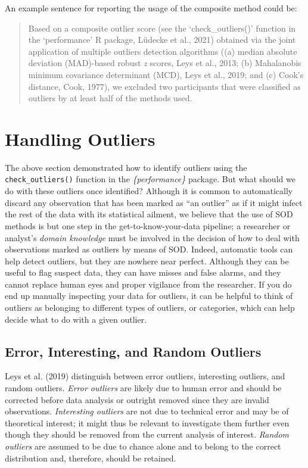 \documentclass{article}
\begin{document}
An example sentence for reporting the usage of the composite method
could be:

\begin{quote}
Based on a composite outlier score (see the `check\_outliers()' function
in the `performance' R package, Lüdecke et al., 2021) obtained via the
joint application of multiple outliers detection algorithms ((a) median
absolute deviation (MAD)-based robust \emph{z} scores, Leys et al.,
2013; (b) Mahalanobis minimum covariance determinant (MCD), Leys et al.,
2019; and (c) Cook's distance, Cook, 1977), we excluded two participants
that were classified as outliers by at least half of the methods used.
\end{quote}

\hypertarget{handling-outliers}{%
\section{Handling Outliers}\label{handling-outliers}}

The above section demonstrated how to identify outliers using the
\texttt{check\_outliers()} function in the \emph{\{performance\}}
package. But what should we do with these outliers once identified?
Although it is common to automatically discard any observation that has
been marked as ``an outlier'' as if it might infect the rest of the data
with its statistical ailment, we believe that the use of SOD methods is
but one step in the get-to-know-your-data pipeline; a researcher or
analyst's \emph{domain knowledge} must be involved in the decision of
how to deal with observations marked as outliers by means of SOD.
Indeed, automatic tools can help detect outliers, but they are nowhere
near perfect. Although they can be useful to flag suspect data, they can
have misses and false alarms, and they cannot replace human eyes and
proper vigilance from the researcher. If you do end up manually
inspecting your data for outliers, it can be helpful to think of
outliers as belonging to different types of outliers, or categories,
which can help decide what to do with a given outlier.

\hypertarget{error-interesting-and-random-outliers}{%
\subsection{Error, Interesting, and Random
Outliers}\label{error-interesting-and-random-outliers}}

Leys et al. (2019) distinguish between error outliers, interesting
outliers, and random outliers. \emph{Error outliers} are likely due to
human error and should be corrected before data analysis or outright
removed since they are invalid observations. \emph{Interesting outliers}
are not due to technical error and may be of theoretical interest; it
might thus be relevant to investigate them further even though they
should be removed from the current analysis of interest. \emph{Random
outliers} are assumed to be due to chance alone and to belong to the
correct distribution and, therefore, should be retained.
\end{document}
